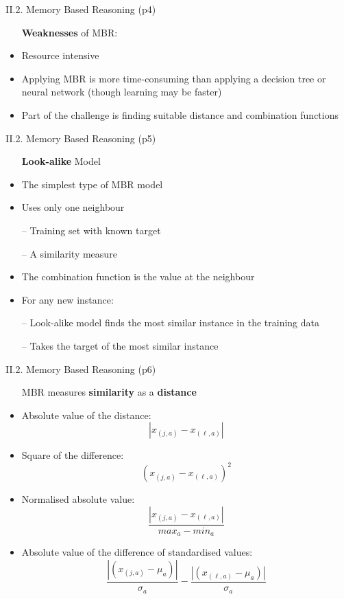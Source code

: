 \documentclass[handout]{beamer}
\newcommand{\strong}[1]{\textbf{\color{teal} #1}}
\begin{document}
\begin{frame}{II.2. Memory Based Reasoning (p4)}
\begin{itemize}
\item[] \strong{Weaknesses} of MBR:
\item[]
\item Resource intensive
\item[]
\item Applying MBR is more time-consuming than applying a decision tree or neural network (though learning may be faster)
\item[]
\item Part of the challenge is finding suitable distance and combination functions
\end{itemize}
\end{frame}
\begin{frame}{II.2. Memory Based Reasoning (p5)}
\begin{itemize}
\item[] \strong{Look-alike} Model
\item[]
\item The simplest type of MBR model
\item Uses only one neighbour
\item[--] Training set with known target
\item[--] A similarity measure
\item The combination function is the value at the neighbour
\item For any new instance:
\item[--] Look-alike model finds the most similar instance in the training data
\item[--] Takes the target of the most similar instance
\end{itemize}
\end{frame}
\begin{frame}{II.2. Memory Based Reasoning (p6)}
\begin{itemize}
\item[] MBR measures \strong{similarity} as a \strong{distance}
\item[]
\item Absolute value of the distance:
\[
	|x_{(j,a)} - x_{(\ell,a)}|
\]
\item Square of the difference:
\[
	(x_{(j,a)} - x_{(\ell,a)})^2
\]
\item Normalised absolute value:
\[
	\frac{|x_{(j,a)} - x_{(\ell,a)}|}{max_a - min_a}
\]
\item Absolute value of the difference of standardised values:
\[
	\frac{|(x_{(j,a)} - \mu_a)|}{\sigma_a} - \frac{|(x_{(\ell,a)} - \mu_a)|}{\sigma_a}
\]
\end{itemize}
\end{frame}
\end{document}
